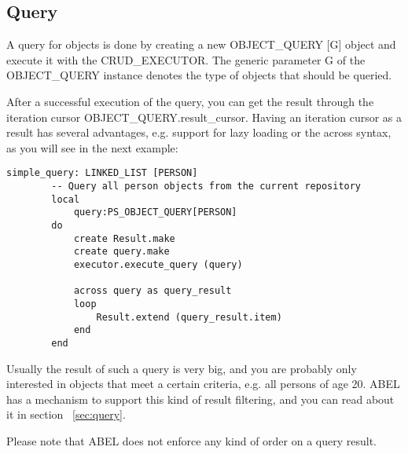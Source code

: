 \subsection{Query}

A query for objects is done by creating a new OBJECT\_QUERY [G] object and execute it with the CRUD\_EXECUTOR.
The generic parameter G of the OBJECT\_QUERY instance denotes the type of objects that should be queried.

After a successful execution of the query, you can get the result through the iteration cursor OBJECT\_QUERY.result\_cursor.
Having an iteration cursor as a result has several advantages, e.g. support for lazy loading or the across syntax, as you will see in the next example:

\begin{lstlisting}[language=OOSC2Eiffel, captionpos=b, caption={}, label={lst:simple_query}]
	simple_query: LINKED_LIST [PERSON]
		-- Query all person objects from the current repository
		local
			query:PS_OBJECT_QUERY[PERSON]
		do
			create Result.make
			create query.make
			executor.execute_query (query)

			across query as	query_result
			loop
				Result.extend (query_result.item)
			end
		end
\end{lstlisting}

Usually the result of such a query is very big, and you are probably only interested in objects that meet a certain criteria, e.g. all persons of age 20.
ABEL has a mechanism to support this kind of result filtering, and you can read about it in section ~\ref{sec:query}.

Please note that ABEL does not enforce any kind of order on a query result.

\begin{comment}
ABEL can also filter the query results in advance so you only get a result set that meets certain criteria: 

\begin{lstlisting}[language=OOSC2Eiffel, captionpos=b, caption={}, label={lst:simple_filtered_query}]
	simple_filtered_query (name:STRING; age:INTEGER): detachable PERSON
		-- Query a person object from the current repository
		local
			query:PS_OBJECT_QUERY[PERSON]
			criterion:PS_PREDEFINED_CRITERION
		do
			create query.make
			create criterion.make ("last_name", "=", name)
			query.set_criterion (criterion)

			from
				executor.execute_query (query)
			until 
				query.result_cursor.after
			loop
				if query.result_cursor.item.age = age then 
					Result:= query.result_cursor.item
				end
			end
		end
\end{lstlisting}

This is just a very simple example for a query with a certain criterion.
ABEL has a powerful mechanism that also supports a logical combinations of multiple criteria, or using agents for filtering.
You can read more about criteria in section XY.

\end{comment}

